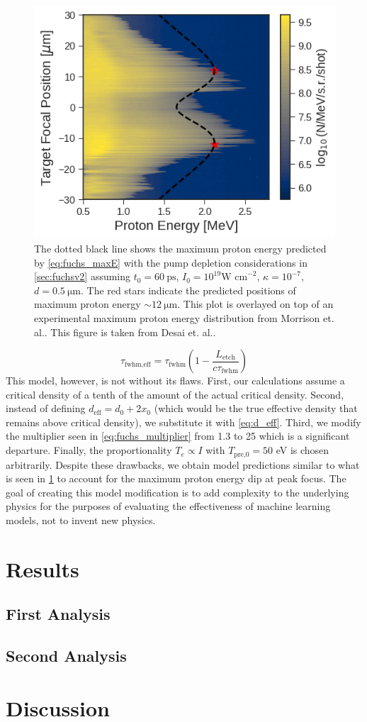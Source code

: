 \begin{figure}
	\centering 
	\includegraphics[width=0.6\linewidth]{planning/images/energy_dip_morrison.png}
	\caption{The dotted black line shows the maximum proton energy predicted by \cref{eq:fuchs_maxE} with the pump depletion considerations in \cref{sec:fuchsv2} assuming $t_0 = \SI{60}{\pico \second}$, $I_0 = 10^{19} \text{W cm}^{-2}$, $\kappa=10^{-7}$, $d=\SI{0.5}{\micro \meter}$. The red stars indicate the predicted positions of maximum proton energy $\sim \SI{12}{\micro \meter}$. This plot is overlayed on top of an experimental maximum proton energy distribution from Morrison et. al.\cite{Morrison_2018_NJoP}. This figure is taken from Desai et. al.\cite{Desai_2024_arX}.}
	\label{fig:energy_dip_morrison}
\end{figure}
\begin{equation}
	\tau_\text{fwhm,eff} = \tau_\text{fwhm} (1 - \frac{L_\text{etch}}{c \tau_\text{fwhm}}) \label{eq:tau_etch}
\end{equation}
This model, however, is not without its flaws. First, our calculations assume a critical density of a tenth of the amount of the actual critical density. Second, instead of defining $d_\text{eff} = d_0 + 2 x_0$ (which would be the true effective density that remains above critical density), we substitute it with \cref{eq:d_eff}. Third, we modify the multiplier seen in \cref{eq:fuchs_multiplier} from 1.3 to 25 which is a significant departure. Finally, the proportionality $T_e \propto I$ with $T_\text{pre,0} = 50$ eV is chosen arbitrarily. Despite these drawbacks, we obtain model predictions similar to what is seen in \cref{fig:energy_dip_morrison} to account for the maximum proton energy dip at peak focus. The goal of creating this model modification is to add complexity to the underlying physics for the purposes of evaluating the effectiveness of machine learning models, not to invent new physics. 

\section{Results}

\subsection{First Analysis}

\subsection{Second Analysis}

\section{Discussion}
